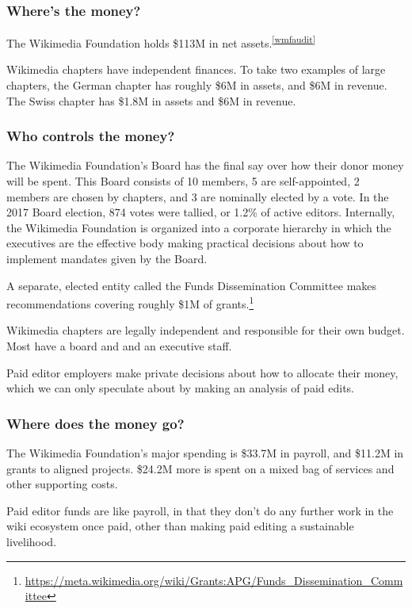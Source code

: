 \subsubsection{Where's the money?}

The Wikimedia Foundation holds \$113M in net assets.\textsuperscript{\ref{wmfaudit}}

Wikimedia chapters have independent finances.  To take two examples of large chapters, the German chapter has roughly \$6M in assets, and \$6M in revenue.  The Swiss chapter has \$1.8M in assets and \$6M in revenue.

\subsubsection{Who controls the money?}

The Wikimedia Foundation's Board has the final say over how their donor money will be spent.  This Board consists of 10 members, 5 are self-appointed, 2 members are chosen by chapters, and 3 are nominally elected by a vote.  In the 2017 Board election, 874 votes were tallied, or 1.2\% of active editors.  Internally, the Wikimedia Foundation is organized into a corporate hierarchy in which the executives are the effective body making practical decisions about how to implement mandates given by the Board.

A separate, elected entity called the Funds Dissemination Committee makes recommendations covering roughly \$1M of grants.\footnote{\url{https://meta.wikimedia.org/wiki/Grants:APG/Funds_Dissemination_Committee}}

Wikimedia chapters are legally independent and responsible for their own budget.  Most have a board and and an executive staff.

Paid editor employers make private decisions about how to allocate their money, which we can only speculate about by making an analysis of paid edits.

\subsubsection{Where does the money go?}

The Wikimedia Foundation's major spending is \$33.7M in payroll, and \$11.2M in grants to aligned projects.  \$24.2M more is spent on a mixed bag of services and other supporting costs.

Paid editor funds are like payroll, in that they don't do any further work in the wiki ecosystem once paid, other than making paid editing a sustainable livelihood.

